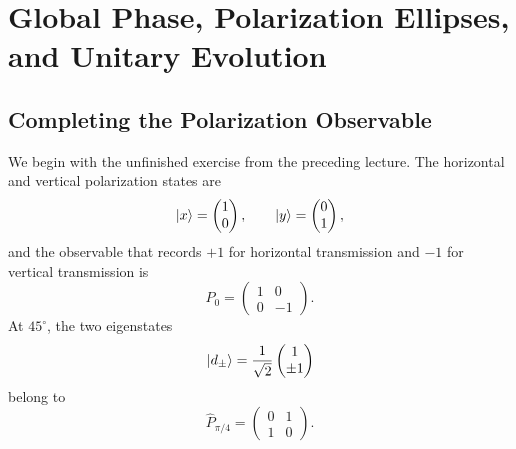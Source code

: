 \chapter{Global Phase, Polarization Ellipses, and Unitary Evolution}

\section{Completing the Polarization Observable}

We begin with the unfinished exercise from the preceding lecture. The
horizontal and vertical polarization states are
\begin{equation}
  \left\lvert x\right\rangle=
  \begin{pmatrix}1\\0\end{pmatrix},
  \qquad
  \left\lvert y\right\rangle=
  \begin{pmatrix}0\\1\end{pmatrix},
\end{equation}
and the observable that records \(+1\) for horizontal transmission and
\(-1\) for vertical transmission is
\begin{equation}
  \hat P_0=
  \begin{pmatrix}
    1&0\\
    0&-1
  \end{pmatrix}.
  \label{eq:l7-P0}
\end{equation}
At \(45^\circ\), the two eigenstates
\begin{equation}
  \left\lvert d_\pm\right\rangle
  =\frac{1}{\sqrt2}
    \begin{pmatrix}1\\ \pm1\end{pmatrix}
\end{equation}
belong to
\begin{equation}
  \hat P_{\pi/4}
  =
  \begin{pmatrix}
    0&1\\
    1&0
  \end{pmatrix}.
  \label{eq:l7-P45}
\end{equation}

